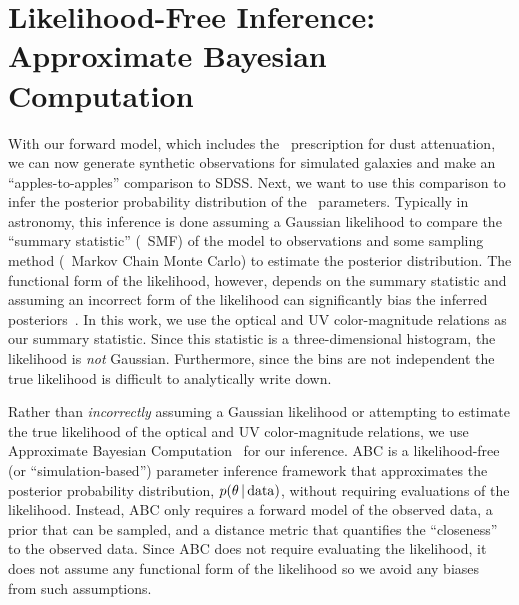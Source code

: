 \section{Likelihood-Free Inference: Approximate Bayesian Computation} \label{sec:abc}
With our forward model, which includes the \eda~prescription for dust
attenuation, we can now generate synthetic observations for simulated
galaxies and make an ``apples-to-apples'' comparison to SDSS. Next, we want
to use this comparison to infer the posterior probability distribution of
the \eda~parameters. Typically in astronomy, this inference is done
assuming a Gaussian likelihood to compare the ``summary statistic''
(\eg~SMF) of the model to observations and some sampling method (\eg~Markov
Chain Monte Carlo) to estimate the posterior distribution. The functional form of the
likelihood, however, depends on the summary statistic and assuming an
incorrect form of the likelihood can significantly bias the inferred
posteriors~\citep[\eg][]{hahn2019}. In this work, we use the optical and UV
color-magnitude relations as our summary statistic. Since this statistic is
a three-dimensional histogram, the likelihood is {\em not} Gaussian.
Furthermore, since the bins are not independent the true likelihood is
difficult to analytically write down.

Rather than \emph{incorrectly} assuming a Gaussian likelihood or attempting
to estimate the true likelihood of the optical and UV color-magnitude
relations, we use Approximate Bayesian Computation~\citep[hereafter
ABC;][]{diggle1984, tavare1997, pritchard1999, beaumont2009, delmoral2012}
for our inference. 
ABC is a likelihood-free (or ``simulation-based'') parameter inference
framework that approximates the posterior probability distribution, $p(\theta\,|\,{\rm data})$, without
requiring evaluations of the likelihood.  Instead, ABC only requires a forward
model of the observed data, a prior that can be sampled, and a distance metric
that quantifies the ``closeness'' to the observed data. 
Since ABC does not require evaluating the likelihood, it does not assume
any functional form of the likelihood so we avoid any biases from such
assumptions. 


